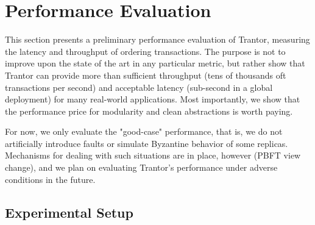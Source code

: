 \documentclass{article}
\begin{document}


\section{Performance Evaluation}
\label{sec:evaluation}

This section presents a preliminary performance evaluation of Trantor, measuring the latency and throughput of ordering transactions.
The purpose is not to improve upon the state of the art in any particular metric,
but rather show that Trantor can provide more than sufficient throughput (tens of thousands oft transactions per second)
and acceptable latency (sub-second in a global deployment) for many real-world applications.
Most importantly, we show that the performance price for modularity and clean abstractions is worth paying.

For now, we only evaluate the "good-case" performance, that is, we do not artificially introduce faults or simulate Byzantine behavior of some replicas.
Mechanisms for dealing with such situations are in place, however (PBFT view change),
and we plan on evaluating Trantor's performance under adverse conditions in the future.

\subsection{Experimental Setup}
\end{document}
